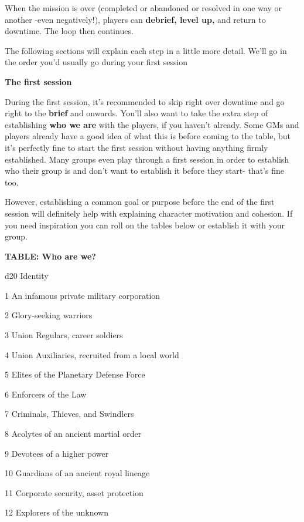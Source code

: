 When the mission is over (completed or abandoned or resolved in one way or another -even negatively!), players can \textbf{debrief, level up,} and return to downtime. The loop then continues.

The following sections will explain each step in a little more detail. We'll go in the order you'd usually go during your first session

\begin{center}
\textbf{The first session}
\end{center}

During the first session, it's recommended to skip right over downtime and go right to the \textbf{brief} and onwards. You'll also want to take the extra step of establishing \textbf{who we are} with the players, if you haven't already. Some GMs and players already have a good idea of what this is before coming to the table, but it's perfectly fine to start the first session without having anything firmly established. Many groups even play through a first session in order to establish who their group is and don't want to establish it before they start- that's fine too.

However, establishing a common goal or purpose before the end of the first session will definitely help with explaining character motivation and cohesion. If you need inspiration you can roll on the tables below or establish it with your group.

\textbf{TABLE: Who are we?}

 d20       Identity

 1         An infamous private military corporation

 2         Glory-seeking warriors

 3         Union Regulars, career soldiers

 4         Union Auxiliaries, recruited from a local world

 5         Elites of the Planetary Defense Force

 6         Enforcers of the Law

 7         Criminals, Thieves, and Swindlers

 8         Acolytes of an ancient martial order

 9         Devotees of a higher power

  10       Guardians of an ancient royal lineage

  11       Corporate security, asset protection

  12       Explorers of the unknown

